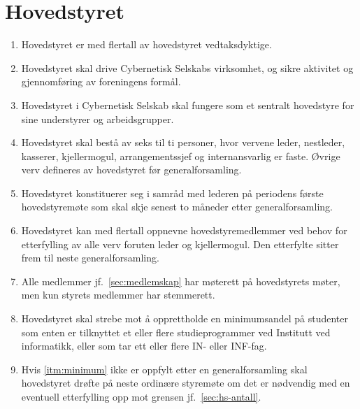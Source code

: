 \documentclass[8pt,norsk,a4paper]{article}
\begin{document}
\section{Hovedstyret}
\begin{enumerate}
	\item{Hovedstyret er med  flertall av hovedstyret vedtaksdyktige.}
	\item{Hovedstyret skal drive Cybernetisk Selskabs virksomhet, og sikre aktivitet og gjennomføring av foreningens formål.}
	\item{Hovedstyret i Cybernetisk Selskab skal fungere som et sentralt hovedstyre for sine understyrer og arbeidsgrupper.}
	\item{Hovedstyret skal bestå av seks til ti personer, hvor vervene leder, nestleder, kasserer, kjellermogul, arrangementssjef og internansvarlig er faste. Øvrige verv defineres av hovedstyret før generalforsamling.\label{sec:hs-antall}}
	\item{Hovedstyret konstituerer seg i samråd med lederen på periodens første hovedstyremøte som skal skje senest to måneder etter generalforsamling.}
	\item{Hovedstyret kan med  flertall oppnevne hovedstyremedlemmer ved behov for etterfylling av alle verv foruten leder og kjellermogul. Den etterfylte sitter frem til neste generalforsamling.} 
	\item{Alle medlemmer jf.~\ref{sec:medlemskap} har møterett på hovedstyrets møter, men kun styrets medlemmer har stemmerett.}
	\item{Hovedstyret skal strebe mot å opprettholde en minimumsandel på  studenter som enten er tilknyttet et eller flere studieprogrammer ved Institutt ved informatikk, eller som tar ett eller flere IN- eller INF-fag.\label{itm:minimum}}
	\item{Hvis \ref{itm:minimum} ikke er oppfylt etter en generalforsamling skal hovedstyret drøfte på neste ordinære styremøte om det er nødvendig med en eventuell etterfylling opp mot grensen jf.~\ref{sec:hs-antall}.}
\end{enumerate}
\end{document}
